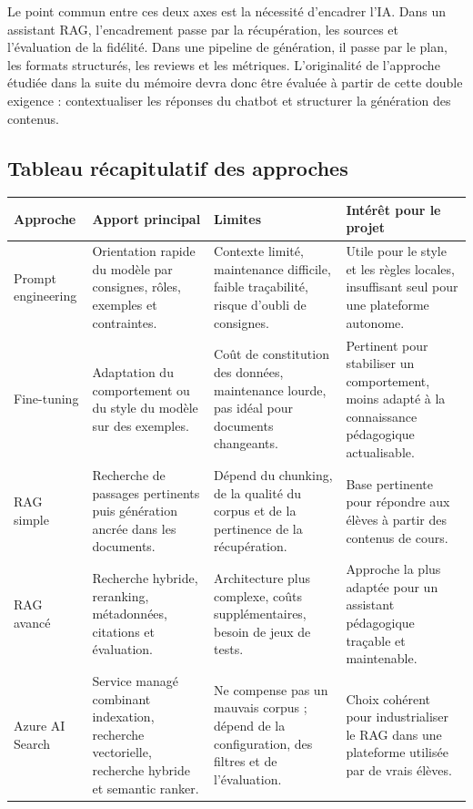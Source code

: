 Le point commun entre ces deux axes est la nécessité d'encadrer l'IA. Dans un assistant
RAG, l'encadrement passe par la récupération, les sources et l'évaluation de la fidélité.
Dans une pipeline de génération, il passe par le plan, les formats structurés, les reviews
et les métriques. L'originalité de l'approche étudiée dans la suite du mémoire devra donc
être évaluée à partir de cette double exigence : contextualiser les réponses du chatbot et
structurer la génération des contenus.

\subsection{Tableau récapitulatif des approches}

\begin{table}[h]
\centering
\small
\begin{tabular}{|p{3cm}|p{3.4cm}|p{4.2cm}|p{3.4cm}|}
\hline
\textbf{Approche} & \textbf{Apport principal} & \textbf{Limites} & \textbf{Intérêt pour le projet} \\
\hline
Prompt engineering &
Orientation rapide du modèle par consignes, rôles, exemples et contraintes. &
Contexte limité, maintenance difficile, faible traçabilité, risque d'oubli de consignes. &
Utile pour le style et les règles locales, insuffisant seul pour une plateforme autonome. \\
\hline
Fine-tuning &
Adaptation du comportement ou du style du modèle sur des exemples. &
Coût de constitution des données, maintenance lourde, pas idéal pour documents changeants. &
Pertinent pour stabiliser un comportement, moins adapté à la connaissance pédagogique actualisable. \\
\hline
RAG simple &
Recherche de passages pertinents puis génération ancrée dans les documents. &
Dépend du chunking, de la qualité du corpus et de la pertinence de la récupération. &
Base pertinente pour répondre aux élèves à partir des contenus de cours. \\
\hline
RAG avancé &
Recherche hybride, reranking, métadonnées, citations et évaluation. &
Architecture plus complexe, coûts supplémentaires, besoin de jeux de tests. &
Approche la plus adaptée pour un assistant pédagogique traçable et maintenable. \\
\hline
Azure AI Search &
Service managé combinant indexation, recherche vectorielle, recherche hybride et semantic ranker. &
Ne compense pas un mauvais corpus ; dépend de la configuration, des filtres et de l'évaluation. &
Choix cohérent pour industrialiser le RAG dans une plateforme utilisée par de vrais élèves. \\

\end{tabular}
\end{table}
